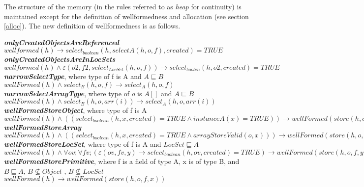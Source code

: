\documentclass{article}
\begin{document}
	The structure of the memory (in the rules referred to as \textit{heap} for continuity) is maintained except for the definition of wellformedness and allocation (see section \ref{alloc}). The new definition of wellformedness is as follows. 

	\textit{\textbf{onlyCreatedObjectsAreReferenced}} \\
	$wellformed(h) \to select_{boolean} (h,selectA (h,o,f), created) = TRUE$ \\
	
	\textit{\textbf{onlyCreatedObjectsAreInLocSets}} \\
	$wellformed(h) \land \varepsilon (o2, f2,select_{LocSet}(h,o, f)) \to  select_{boolen}(h,o2, created) = TRUE $\\
		
	\textit{\textbf{narrowSelectType}},  where type of f is A and $A \sqsubseteq B$ \\
	$wellFormed(h) \land select_B(h,o, f) \to select_A(h,o, f)$\\
		
	\textit{\textbf{narrowSelectArrayType}},  where type of $o$ is $A[]$ and $A \sqsubseteq B$  \\
	$wellFormed(h) \land select_B(h,o,arr(i)) \to select_A(h,o,arr(i))$\\
	
	\textit{\textbf{wellFormedStoreObject}}, where type of f is A \\
	$wellFormed(h) \land ((select_{boolean}(h, x, created) = TRUE \land instanceA(x) = TRUE)) \to wellFormed(store(h,o, f, x))$\\
	
	\textit{\textbf{wellFormedStoreArray}} \\
	$wellFormed(h) \land ( (select_{boolean}(h, x, created) = TRUE \land arrayStoreValid(o, x)))
	\to wellFormed(store(h,o,arr(idx), x)))$\\
	
	\textit{\textbf{wellFormedStoreLocSet}}, where type of f is A and $LocSet \sqsubseteq A$ \\
	$wellFormed(h)\land \forall ov;\forall f v;(\varepsilon (ov, f v, y) \to select_{boolean}(h,ov, created) = TRUE) \to wellFormed(store(h,o, f, y)) $\\
	
	\textit{\textbf{wellFormedStorePrimitive}}, where f is a field of type A, x is of type B, and $B \sqsubseteq A$, $B 
	\nsubseteq Object$ , $B \nsubseteq LocSet$\\
	$wellFormed(h) \to wellFormed(store(h,o, f, x))$\\
	
\end{document}
